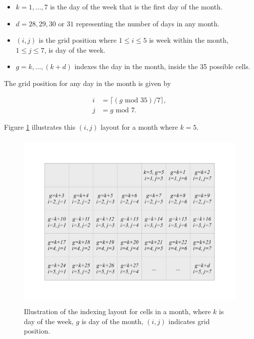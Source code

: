 \begin{itemize}
\tightlist
\item
  \(k = 1, \dots , 7\) is the day of the week that is the first day of
  the month.
\item
  \(d = 28, 29, 30\) or \(31\) representing the number of days in any
  month.
\item
  \((i, j)\) is the grid position where \(1 \le i \le 5\) is week within
  the month, \(1 \le j \le 7\), is day of the week.
\item
  \(g = k, \dots,(k+d)\) indexes the day in the month, inside the 35
  possible cells.
\end{itemize}

The grid position for any day in the month is given by

\begin{equation}
  \begin{aligned}
  i &= \lceil (g \text{ mod } 35) / 7\rceil, \\
  j &= g \text{ mod } 7. \label{eq:grid}
  \end{aligned}
\end{equation}

Figure \ref{fig:month-diagram} illustrates this \((i,j)\) layout for a
month where \(k=5\).

\begin{Schunk}
\begin{figure}

{\centering \includegraphics[width=360pt,height=250pt]{img/month} 

}

\caption[Illustration of the indexing layout for cells in a month, where $k$ is day of the week, $g$ is day of the month, $(i, j)$ indicates grid position]{Illustration of the indexing layout for cells in a month, where $k$ is day of the week, $g$ is day of the month, $(i, j)$ indicates grid position.}\label{fig:month-diagram}
\end{figure}
\end{Schunk}

